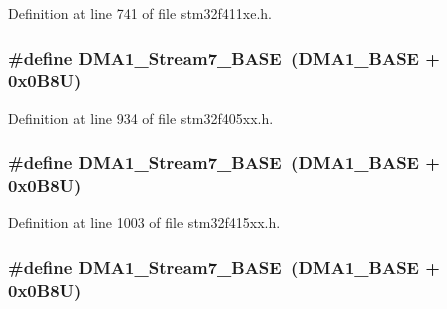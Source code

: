 Definition at line 741 of file stm32f411xe.\+h.

\subsubsection[{\texorpdfstring{D\+M\+A1\+\_\+\+Stream7\+\_\+\+B\+A\+SE}{DMA1_Stream7_BASE}}]{\setlength{\rightskip}{0pt plus 5cm}\#define D\+M\+A1\+\_\+\+Stream7\+\_\+\+B\+A\+SE~({\bf D\+M\+A1\+\_\+\+B\+A\+SE} + 0x0\+B8\+U)}\hypertarget{group___peripheral__registers__structures_ga82186dd6d3f60995d428b34c041919d7}{}\label{group___peripheral__registers__structures_ga82186dd6d3f60995d428b34c041919d7}


Definition at line 934 of file stm32f405xx.\+h.

\subsubsection[{\texorpdfstring{D\+M\+A1\+\_\+\+Stream7\+\_\+\+B\+A\+SE}{DMA1_Stream7_BASE}}]{\setlength{\rightskip}{0pt plus 5cm}\#define D\+M\+A1\+\_\+\+Stream7\+\_\+\+B\+A\+SE~({\bf D\+M\+A1\+\_\+\+B\+A\+SE} + 0x0\+B8\+U)}\hypertarget{group___peripheral__registers__structures_ga82186dd6d3f60995d428b34c041919d7}{}\label{group___peripheral__registers__structures_ga82186dd6d3f60995d428b34c041919d7}


Definition at line 1003 of file stm32f415xx.\+h.

\subsubsection[{\texorpdfstring{D\+M\+A1\+\_\+\+Stream7\+\_\+\+B\+A\+SE}{DMA1_Stream7_BASE}}]{\setlength{\rightskip}{0pt plus 5cm}\#define D\+M\+A1\+\_\+\+Stream7\+\_\+\+B\+A\+SE~({\bf D\+M\+A1\+\_\+\+B\+A\+SE} + 0x0\+B8\+U)}\hypertarget{group___peripheral__registers__structures_ga82186dd6d3f60995d428b34c041919d7}{}\label{group___peripheral__registers__structures_ga82186dd6d3f60995d428b34c041919d7}


